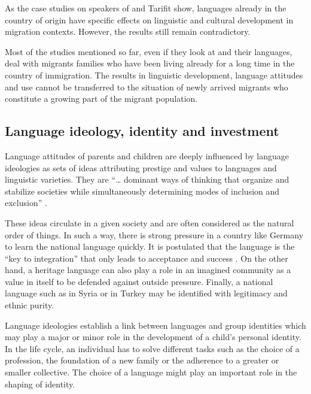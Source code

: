 \documentclass[output=paper,colorlinks,citecolor=brown]{langscibook}
\begin{document}
As the case studies on speakers of  and Tarifit  show,  languages already in the country of origin have specific effects on linguistic and cultural development in migration contexts. However, the results still remain contradictory. 

Most of the studies mentioned so far, even if they look at  and their languages, deal with migrants families who have been living already for a long time in the country of immigration. The results in linguistic development, language attitudes and use cannot be transferred to the situation of newly arrived migrants who constitute a growing part of the migrant population. 

\subsection{Language ideology, identity and investment}\label{ch2.5.ss.2.4}

Language attitudes of parents and children are deeply influenced by language ideologies as sets of ideas attributing prestige and values to languages and linguistic varieties. They are ``… dominant ways of thinking that organize and stabilize societies while simultaneously determining modes of inclusion and exclusion'' \citep[72]{darvin_norton2015}.

These ideas circulate in a given society and are often considered as the natural order of things. In such a way, there is strong pressure in a country like Germany to learn the national language quickly. It is postulated that the  language is the ``key to integration'' that only leads to acceptance and success \citep{gogolin1994}. On the other hand, a heritage language can also play a role in an imagined community as a value in itself to be defended against outside pressure. Finally, a national language such as  in Syria or  in Turkey may be identified with legitimacy and ethnic purity. 

Language ideologies establish a link between languages and group identities which may play a major or minor role in the development of a child's personal identity. In the life cycle, an individual has to solve different tasks such as the choice of a profession, the foundation of a new family or the adherence to a greater or smaller collective. The choice of a language might play an important role in the shaping of identity.
\end{document}
